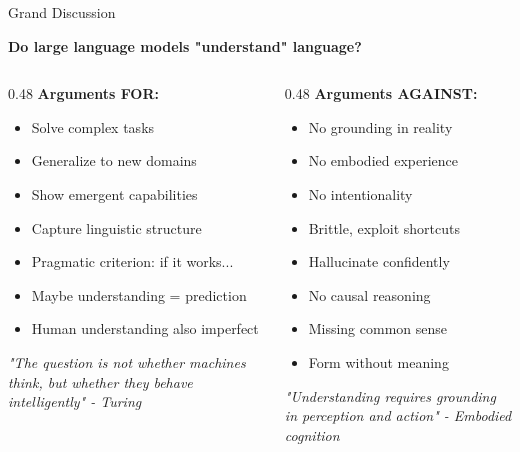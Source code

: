 \documentclass[aspectratio=169]{beamer}
\begin{document}
\begin{frame}[shrink=10]{Grand Discussion 💬}
\begin{center}
\Large
\textbf{Do large language models "understand" language?}
\end{center}

\vspace{1em}

\begin{columns}[T]
\begin{column}{0.48\textwidth}
\textbf{Arguments FOR:}
\begin{itemize}\setlength{\itemsep}{0pt}
    \item Solve complex tasks
    \item Generalize to new domains
    \item Show emergent capabilities
    \item Capture linguistic structure
    \item Pragmatic criterion: if it works...
    \item Maybe understanding = prediction
    \item Human understanding also imperfect
\end{itemize}

\vspace{0.5em}
\textit{"The question is not whether machines think, but whether they behave intelligently" - Turing}
\end{column}

\begin{column}{0.48\textwidth}
\textbf{Arguments AGAINST:}
\begin{itemize}\setlength{\itemsep}{0pt}
    \item No grounding in reality
    \item No embodied experience
    \item No intentionality
    \item Brittle, exploit shortcuts
    \item Hallucinate confidently
    \item No causal reasoning
    \item Missing common sense
    \item Form without meaning
\end{itemize}

\vspace{0.5em}
\textit{"Understanding requires grounding in perception and action" - Embodied cognition}
\end{column}
\end{columns}


\end{frame}
\end{document}
